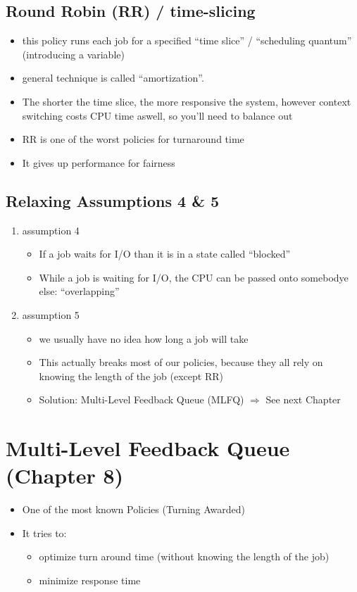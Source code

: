 \documentclass[11pt]{report}
\begin{document}
\section{Round Robin (RR) / time-slicing}
\label{sec:orgc7555bf}
\begin{itemize}
\item this policy runs each job for a specified ``time slice'' / ``scheduling quantum'' (introducing a variable)
\item general technique is called ``amortization''.
\item The shorter the time slice, the more responsive the system, however context switching costs CPU time aswell, so you'll need to balance out
\item RR is one of the worst policies for turnaround time
\item It gives up performance for fairness
\end{itemize}
\section{Relaxing Assumptions 4 \& 5}
\label{sec:orgac13a29}
\begin{enumerate}
\item assumption 4
\label{sec:org61b9a39}
\begin{itemize}
\item If a job waits for I/O than it is in a state called ``blocked''
\item While a job is waiting for I/O, the CPU can be passed onto somebodye else: ``overlapping''
\end{itemize}
\item assumption 5
\label{sec:org64b9783}
\begin{itemize}
\item we usually have no idea how long a job will take
\item This actually breaks most of our policies, because they all rely on knowing the length of the job (except RR)
\item Solution: Multi-Level Feedback Queue (MLFQ) \(\Rightarrow\) See next Chapter
\end{itemize}
\end{enumerate}
\chapter{Multi-Level Feedback Queue (Chapter 8)}
\label{sec:org36243f5}
\begin{itemize}
\item One of the most known Policies (Turning Awarded)
\item It tries to:
\begin{itemize}
\item optimize turn around time (without knowing the length of the job)
\item minimize response time
\end{itemize}
\end{itemize}
\end{document}
